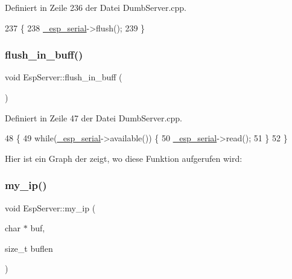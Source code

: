 Definiert in Zeile 236 der Datei Dumb\+Server.\+cpp.


\begin{DoxyCode}
237 \{
238   \hyperlink{class_esp_server_a33166aa92db341d47cdf1776492cca62}{\_esp\_serial}->flush();
239 \}
\end{DoxyCode}
\mbox{\label{class_esp_server_a191aa3259094cf1d2c0f22cdfbca9f58}} 
\subsubsection{\texorpdfstring{flush\+\_\+in\+\_\+buff()}{flush\_in\_buff()}}
{\footnotesize\ttfamily void Esp\+Server\+::flush\+\_\+in\+\_\+buff (\begin{DoxyParamCaption}{ }\end{DoxyParamCaption})\hspace{0.3cm}{\ttfamily [private]}}



Definiert in Zeile 47 der Datei Dumb\+Server.\+cpp.


\begin{DoxyCode}
48 \{
49   \textcolor{keywordflow}{while}(\hyperlink{class_esp_server_a33166aa92db341d47cdf1776492cca62}{\_esp\_serial}->available()) \{
50     \hyperlink{class_esp_server_a33166aa92db341d47cdf1776492cca62}{\_esp\_serial}->read();
51   \}
52 \}
\end{DoxyCode}
Hier ist ein Graph der zeigt, wo diese Funktion aufgerufen wird\+:
\mbox{\label{class_esp_server_a55995fd6398892be5768da85dde4f533}} 
\subsubsection{\texorpdfstring{my\+\_\+ip()}{my\_ip()}}
{\footnotesize\ttfamily void Esp\+Server\+::my\+\_\+ip (\begin{DoxyParamCaption}\item[{char $\ast$}]{buf,  }\item[{size\+\_\+t}]{buflen }\end{DoxyParamCaption})}



